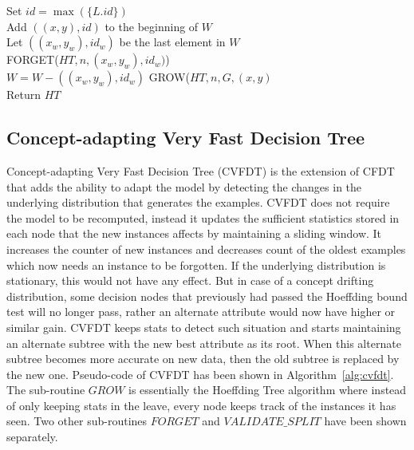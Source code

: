 \begin{algorithm}[htbp]
{{            Set $id = \max(\{L.id\})$ \\
            Add $((x, y), id)$ to the beginning of $W$ \\
             {
                Let $((x_w, y_w), id_w)$ be the last element in $W$ \\
                FORGET($HT, n, (x_w, y_w), id_w)$) \label{algln:cvfdt:forget} \\
                $W = W - ((x_w, y_w), id_w)$
            }
            GROW($HT, n, G, (x,y)$ \\
        }
        Return $HT$
    }
\end{algorithm}
\subsection{Concept-adapting Very Fast Decision Tree}
Concept-adapting Very Fast Decision Tree (CVFDT) is the extension of CFDT that adds the ability to adapt the model by detecting the changes in the underlying distribution that generates the examples. CVFDT does not require the model to be recomputed, instead it updates the sufficient statistics stored in each node that the new instances affects by maintaining a sliding window. It increases the counter of new instances and decreases count of the oldest examples which now needs an instance to be forgotten. If the underlying distribution is stationary, this would not have any effect. But in case of a concept drifting distribution, some decision nodes that previously had passed the Hoeffding bound test will no longer pass, rather an alternate attribute would now have higher or similar gain. CVFDT keeps stats to detect such situation and starts maintaining an alternate subtree with the new best attribute as its root. When this alternate subtree becomes more accurate on new data, then the old subtree is replaced by the new one. Pseudo-code of CVFDT has been shown in Algorithm~\ref{alg:cvfdt}. The sub-routine $GROW$ is essentially the Hoeffding Tree algorithm where instead of only keeping stats in the leave, every node keeps track of the instances it has seen. Two other sub-routines $FORGET$ and $VALIDATE\_SPLIT$ have been shown separately.

